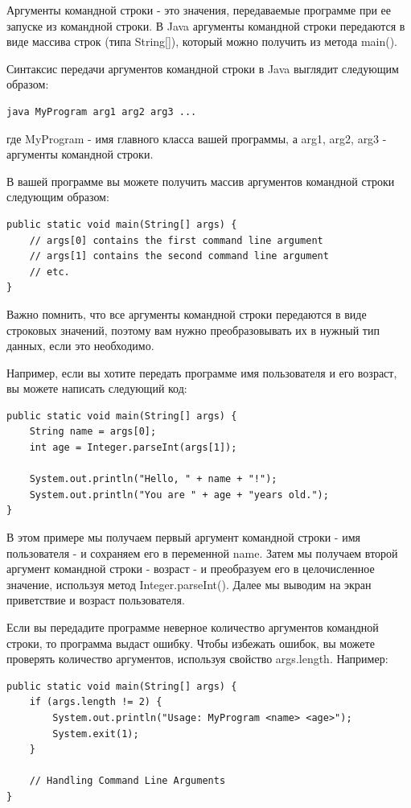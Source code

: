 Аргументы командной строки - это значения, передаваемые программе при ее запуске из командной строки. В Java аргументы командной строки передаются в виде массива строк (типа String[]), который можно получить из метода main().

Синтаксис передачи аргументов командной строки в Java выглядит следующим образом:

\begin{lstlisting}
java MyProgram arg1 arg2 arg3 ...
\end{lstlisting}

где MyProgram - имя главного класса вашей программы, а arg1, arg2, arg3 - аргументы командной строки.

В вашей программе вы можете получить массив аргументов командной строки следующим образом:

\begin{lstlisting}
public static void main(String[] args) {
    // args[0] contains the first command line argument
    // args[1] contains the second command line argument
    // etc.
}
\end{lstlisting}

Важно помнить, что все аргументы командной строки передаются в виде строковых значений, поэтому вам нужно преобразовывать их в нужный тип данных, если это необходимо.

Например, если вы хотите передать программе имя пользователя и его возраст, вы можете написать следующий код:

\begin{lstlisting}
public static void main(String[] args) {
    String name = args[0];
    int age = Integer.parseInt(args[1]);
    
    System.out.println("Hello, " + name + "!");
    System.out.println("You are " + age + "years old.");
}
\end{lstlisting}

В этом примере мы получаем первый аргумент командной строки - имя пользователя - и сохраняем его в переменной name. Затем мы получаем второй аргумент командной строки - возраст - и преобразуем его в целочисленное значение, используя метод Integer.parseInt(). Далее мы выводим на экран приветствие и возраст пользователя.

Если вы передадите программе неверное количество аргументов командной строки, то программа выдаст ошибку. Чтобы избежать ошибок, вы можете проверять количество аргументов, используя свойство args.length. Например:

\begin{lstlisting}
public static void main(String[] args) {
    if (args.length != 2) {
        System.out.println("Usage: MyProgram <name> <age>");
        System.exit(1);
    }
    
    // Handling Command Line Arguments
}
\end{lstlisting}

